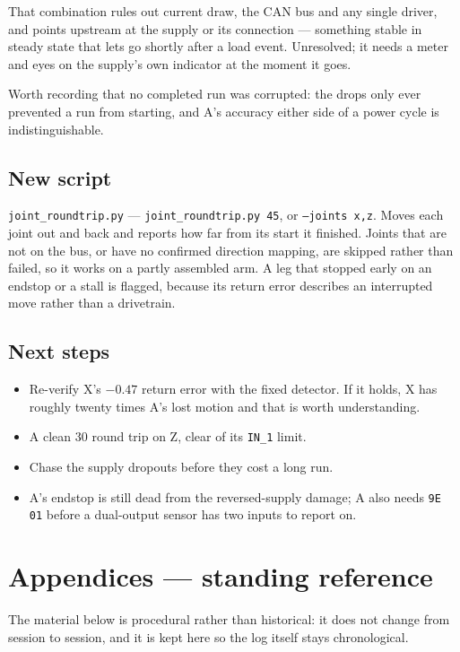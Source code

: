 \documentclass[11pt,letterpaper]{article}
\begin{document}
That combination rules out current draw, the CAN bus and any single driver, and
points upstream at the supply or its connection --- something stable in steady
state that lets go shortly after a load event. Unresolved; it needs a meter and
eyes on the supply's own indicator at the moment it goes.

Worth recording that no completed run was corrupted: the drops only ever
prevented a run from starting, and A's accuracy either side of a power cycle is
indistinguishable.

\subsection{New script}
\texttt{joint\_roundtrip.py} --- \texttt{joint\_roundtrip.py 45}, or
\texttt{--joints x,z}. Moves each joint out and back and reports how far from its
start it finished. Joints that are not on the bus, or have no confirmed direction
mapping, are skipped rather than failed, so it works on a partly assembled arm.
A leg that stopped early on an endstop or a stall is flagged, because its return
error describes an interrupted move rather than a drivetrain.

\subsection{Next steps}
\begin{itemize}
    \item Re-verify X's $-0.47$\textdegree{} return error with the fixed
    detector. If it holds, X has roughly twenty times A's lost motion and that is
    worth understanding.
    \item A clean 30\textdegree{} round trip on Z, clear of its
    \texttt{IN\_1} limit.
    \item Chase the supply dropouts before they cost a long run.
    \item A's endstop is still dead from the reversed-supply damage; A also needs
    \texttt{9E 01} before a dual-output sensor has two inputs to report on.
\end{itemize}

\newpage
\appendix
\section*{Appendices --- standing reference}
The material below is procedural rather than historical: it does not change from
session to session, and it is kept here so the log itself stays chronological.
\end{document}
